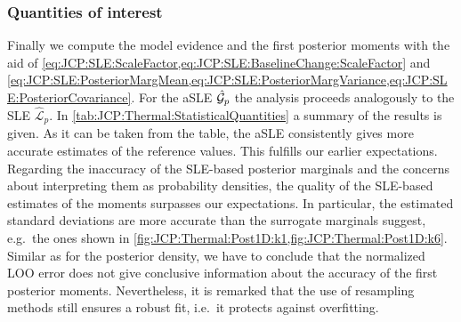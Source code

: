 \subsubsection{Quantities of interest}
Finally we compute the model evidence and the first posterior moments with the aid of
\cref{eq:JCP:SLE:ScaleFactor,eq:JCP:SLE:BaselineChange:ScaleFactor} and \cref{eq:JCP:SLE:PosteriorMargMean,eq:JCP:SLE:PosteriorMargVariance,eq:JCP:SLE:PosteriorCovariance}.
For the aSLE \(\hat{\mathcal{G}}_p\) the analysis proceeds analogously to the SLE \(\hat{\mathcal{L}}_p\).
In \cref{tab:JCP:Thermal:StatisticalQuantities} a summary of the results is given.
As it can be taken from the table, the aSLE consistently gives more accurate estimates of the reference values.
This fulfills our earlier expectations.
Regarding the inaccuracy of the SLE-based posterior marginals and the concerns about interpreting them as probability densities, 
the quality of the SLE-based estimates of the moments surpasses our expectations.
In particular, the estimated standard deviations are more accurate than the surrogate marginals suggest, e.g.\ the ones shown in \cref{fig:JCP:Thermal:Post1D:k1,fig:JCP:Thermal:Post1D:k6}.
Similar as for the posterior density, we have to conclude that the normalized LOO error does not give conclusive information about the accuracy of the first posterior moments.
Nevertheless, it is remarked that the use of resampling methods still ensures a robust fit, i.e.\ it protects against overfitting.
